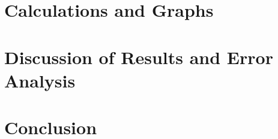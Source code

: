 \documentclass[12pt,letterpaper,titlepage]{report}
\begin{document}

\bigskip
\section*{Calculations and Graphs}

\begin{minipage}{\linewidth}
\centering
{}

\end{minipage}

\bigskip
\bigskip

\begin{minipage}{\linewidth}
\centering
{}

\end{minipage}



\bigskip
\section*{Discussion of Results and Error Analysis}



\bigskip
\section*{Conclusion}


\end{document}
